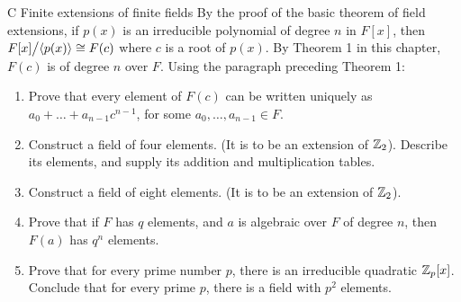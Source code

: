 \begin{exercise}{C Finite extensions of finite fields}
By the proof of the basic theorem of field extensions, if $p(x)$ is an irreducible polynomial of degree $n$ in $F[x]$, then ${\textstyle F[x]}\big/{\textstyle \langle p(x)\rangle}\cong F(c)$ where $c$ is a root of $p(x)$. By Theorem 1 in this chapter, $F(c)$ is of degree $n$ over $F$. Using the paragraph preceding Theorem 1:
\begin{enumerate}
    \item Prove that every element of $F(c)$ can be written uniquely as $a_0+\dots+a_{n-1}c^{n-1}$, for some $a_0,\dots,a_{n-1}\in F$.
    \item Construct a field of four elements. (It is to be an extension of $\mathbb{Z}_2$). Describe its elements, and supply its addition and multiplication tables.
    \item Construct a field of eight elements. (It is to be an extension of $\mathbb{Z}_2$).
    \item Prove that if $F$ has $q$ elements, and $a$ is algebraic over $F$ of degree $n$, then $F(a)$ has $q^n$ elements.
    \item Prove that for every prime number $p$, there is an irreducible quadratic $\mathbb{Z}_p[x]$. Conclude that for every prime $p$, there is a field with $p^2$ elements. 
\end{enumerate}
\end{exercise}
